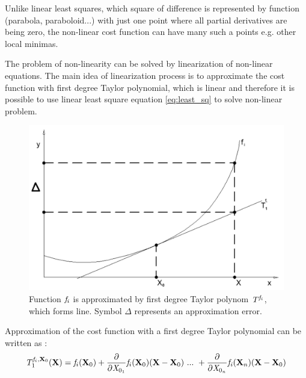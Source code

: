 \documentclass[a4paper,12pt]{article}
\newcommand{\evect}[1]{
{\bf #1}
}
\newcommand{\escal}[1]{
{\it #1}
}
\newcommand{\efunc}[1]{
{\it #1}
}
\begin{document}
Unlike linear least squares, which square of difference \label{eq:least_be_part}
is represented by function  (parabola, paraboloid...) with just one point where all
partial derivatives are being zero, the non-linear cost function can have many such a points e.g. other local minimas. 

The problem of non-linearity can be solved by linearization of non-linear equations.
The main idea of linearization process is to approximate the cost function with first degree Taylor polynomial,
which is linear and therefore it is possible to use linear least square equation \eqref{eq:least_sq} 
to solve non-linear problem. 

\begin{figure}[h]
    \centering
    \includegraphics[scale=0.2]{figures/taylor.png}
    \caption{Function $\efunc{f}_{i}$ is approximated by first degree Taylor polynom $\efunc{T} ^{\efunc{f}_{i}}$,
    which forms line. Symbol $\Delta$ represents an approximation error.}
    \label{fig:taylor}
\end{figure}


Approximation of the cost function with a first degree Taylor polynomial can be written as \cite{cadaprednaskove}:
\begin{equation}
\efunc{T} ^{\efunc{f}_{i}, \evect{X}_{0}}_{1} (\evect{X}) = 
	      \efunc{f}_{i}(\evect{X}_{0}) + 
               \frac{\partial}{\partial {\escal{X}_{0_{1}}}} \efunc{f}_{i} (\evect{X}_{0}) (\evect{X} -  \evect{X}_{0}) 
\ ... \ + \frac{\partial}{\partial {\escal{X}_{0_{n}}}} \efunc{f_{i}}(\evect{X}_{n}) (\evect{X} - \evect{X}_{0}) 
\end{equation}

\end{document}
